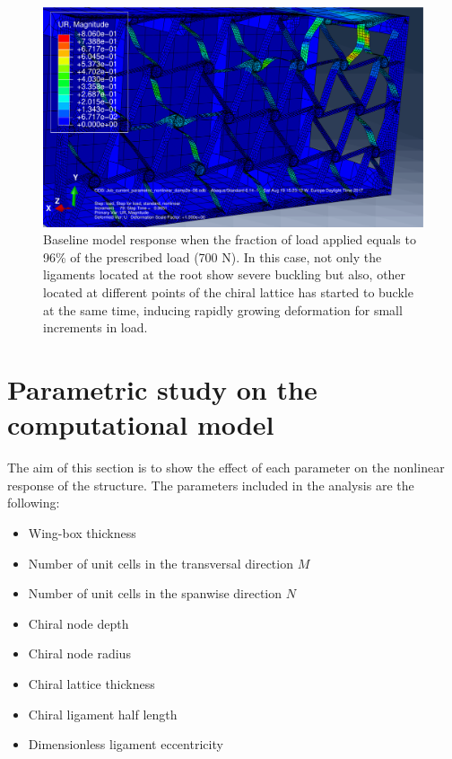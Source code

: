   \begin{figure}[!htpb] %
    \centering
    \includegraphics[width=0.8 \textwidth]{figures/result-sim/3-UR}
    \caption[Baseline model response when the fraction of load applied equals to 96\% of the prescribed load (700 N)]{Baseline model response when the fraction of load applied equals to 96\% of the prescribed load (700 N). In this case, not only the ligaments located at the root show severe buckling but also, other located at different points of the chiral lattice has started to buckle at the same time, inducing rapidly growing deformation for small increments in load.}\label{fig:3-UR}
  \end{figure}

\clearpage
\section{Parametric study on the computational model} \label{sec:computationalParametricStudy_results_sim}
  The aim of this section is to show the effect of each parameter on the nonlinear response of the structure. The parameters  included in the analysis are the following:
  \begin{itemize}
    \item Wing-box thickness \boxt
    \item Number of unit cells in the transversal direction $M$
    \item Number of unit cells in the spanwise direction $N$
    \item Chiral node depth \chiB
    \item Chiral node radius \chir
    \item Chiral lattice thickness \chit
    \item Chiral ligament half length \chiL
    \item Dimensionless ligament eccentricity \chie
  \end{itemize}

